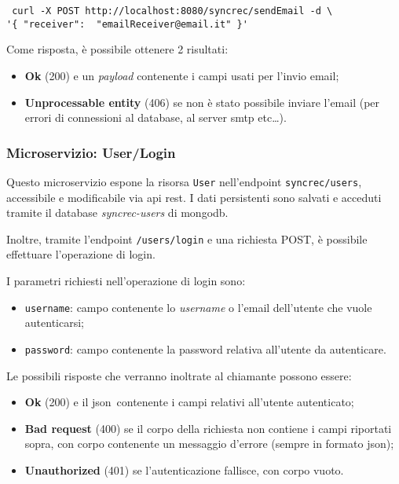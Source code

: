 \begin{tcolorbox}
	\begin{verbatim} curl -X POST http://localhost:8080/syncrec/sendEmail -d \
'{ "receiver":  "emailReceiver@email.it" }'
	\end{verbatim}
\end{tcolorbox}

Come risposta, è possibile ottenere 2 risultati:
\begin{itemize}
	\item \textbf{Ok} (200) e un \textit{payload} contenente i campi usati
	per l'invio email;
	\item \textbf{Unprocessable entity} (406) se non è stato possibile inviare l'email (per errori di connessioni al database, al server \acrshort{smtp} etc\dots).
\end{itemize}

\subsubsection{Microservizio: User/Login}

Questo \gls{microservizio} espone la risorsa \texttt{User} nell'endpoint
\texttt{syncrec/users}, accessibile e modificabile via \gls{api} \acrshort{rest}\gloss. I dati persistenti sono salvati e acceduti tramite il database \textit{syncrec-users} di
\gls{mongodb}.

Inoltre, tramite l'endpoint \texttt{/users/login} e una richiesta POST,
è possibile effettuare l'operazione di login.

I parametri richiesti nell'operazione di login sono:
\begin{itemize}
	\item \texttt{username}: campo contenente lo \textit{username} o l'email dell'utente che vuole autenticarsi;
	\item \texttt{password}: campo contenente la password relativa all'utente da autenticare.
\end{itemize}

Le possibili risposte che verranno inoltrate al chiamante possono essere:
\begin{itemize}
	\item \textbf{Ok} (200) e il \acrshort{json}\gloss\ contenente i campi relativi all'utente autenticato;
	\item \textbf{Bad request} (400) se il corpo della richiesta non contiene i campi riportati sopra, con corpo contenente un messaggio d'errore (sempre in formato \acrshort{json});
	\item \textbf{Unauthorized} (401) se l'autenticazione fallisce, con corpo vuoto.
\end{itemize}

